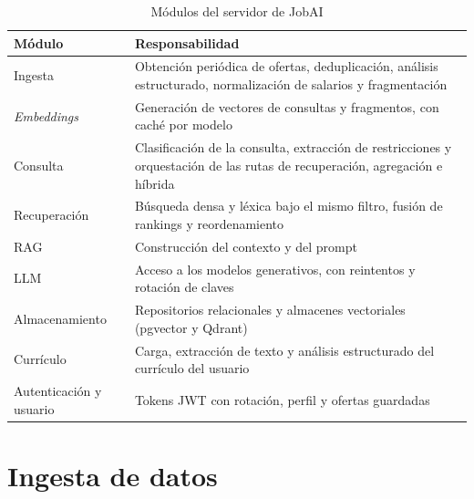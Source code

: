 \begin{table}[htbp!]
    \centering
    \caption{Módulos del servidor de JobAI}
    \label{tab:art-modulos}
    \begin{tabular}{|p{3.2cm}|p{11cm}|}
        \hline
        \textbf{Módulo} & \textbf{Responsabilidad} \\
        \hline
        Ingesta & Obtención periódica de ofertas, deduplicación, análisis estructurado, normalización de salarios y fragmentación \\
        \hline
        \textit{Embeddings} & Generación de vectores de consultas y fragmentos, con caché por modelo \\
        \hline
        Consulta & Clasificación de la consulta, extracción de restricciones y orquestación de las rutas de recuperación, agregación e híbrida \\
        \hline
        Recuperación & Búsqueda densa y léxica bajo el mismo filtro, fusión de rankings y reordenamiento \\
        \hline
        RAG & Construcción del contexto y del prompt \\
        \hline
        LLM & Acceso a los modelos generativos, con reintentos y rotación de claves \\
        \hline
        Almacenamiento & Repositorios relacionales y almacenes vectoriales (pgvector y Qdrant) \\
        \hline
        Currículo & Carga, extracción de texto y análisis estructurado del currículo del usuario \\
        \hline
        Autenticación y usuario & Tokens JWT con rotación, perfil y ofertas guardadas \\
        \hline
    \end{tabular}
\end{table}

\section{Ingesta de datos}
\label{sec:art-ingesta}

